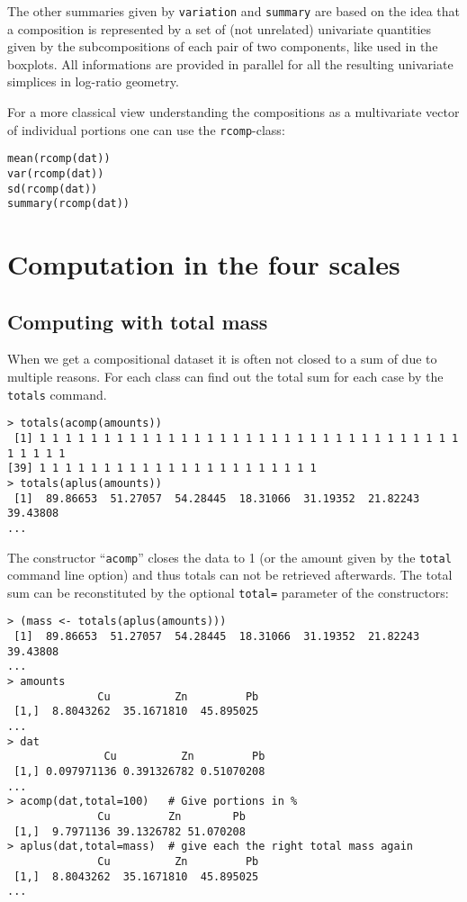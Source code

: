 \documentclass{article}
\newcommand{\code}[1]{{\tt #1}}
\begin{document}
\par
The other summaries given by \code{variation} and \code{summary} are based on
the idea that a composition is represented by a set of (not unrelated)
univariate quantities given by the subcompositions of each pair of two
components, like used in the boxplots. All informations are provided in
parallel for all the resulting univariate simplices in log-ratio geometry.
\par
For a more classical view understanding the compositions as a multivariate
vector of individual portions one can use the \code{rcomp}-class:
\begin{verbatim}
mean(rcomp(dat))  
var(rcomp(dat))
sd(rcomp(dat))
summary(rcomp(dat))   
\end{verbatim}


\section{Computation in the four scales}
\subsection{Computing with total mass}
When we get a compositional dataset it is often not closed to a sum of due to
multiple reasons. For each class can find out the total sum for each case by
the \code{totals} command.
\begin{verbatim}
> totals(acomp(amounts))
 [1] 1 1 1 1 1 1 1 1 1 1 1 1 1 1 1 1 1 1 1 1 1 1 1 1 1 1 1 1 1 1 1 1 1 1 1 1 1 1
[39] 1 1 1 1 1 1 1 1 1 1 1 1 1 1 1 1 1 1 1 1 1 1
> totals(aplus(amounts))
 [1]  89.86653  51.27057  54.28445  18.31066  31.19352  21.82243  39.43808
...
\end{verbatim}
The constructor ``\code{acomp}'' closes the data to 1 (or the amount given by
the \code{total} command line option) and thus totals can not be retrieved
afterwards. The total sum can be reconstituted by the optional \code{total=}
parameter of the constructors:
\begin{verbatim}
> (mass <- totals(aplus(amounts)))
 [1]  89.86653  51.27057  54.28445  18.31066  31.19352  21.82243  39.43808
...
> amounts
              Cu          Zn         Pb
 [1,]  8.8043262  35.1671810  45.895025
...
> dat
               Cu          Zn         Pb
 [1,] 0.097971136 0.391326782 0.51070208
...
> acomp(dat,total=100)   # Give portions in %
              Cu         Zn        Pb
 [1,]  9.7971136 39.1326782 51.070208
> aplus(dat,total=mass)  # give each the right total mass again
              Cu          Zn         Pb
 [1,]  8.8043262  35.1671810  45.895025
...
\end{verbatim}
\end{document}
